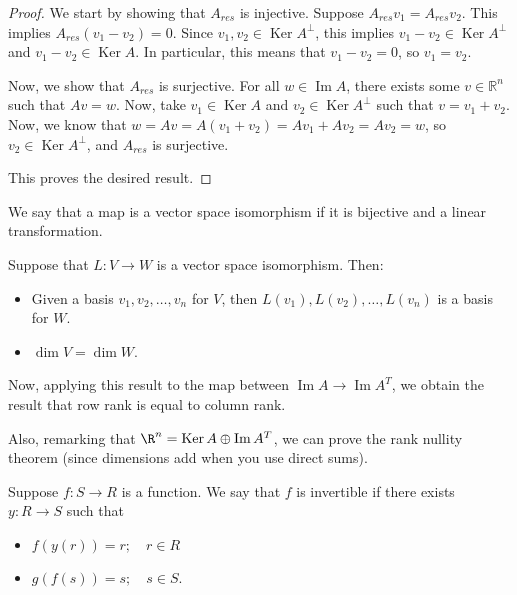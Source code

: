 \documentclass{article}
\newcommand{\RR}{\mathbb{R}}
\DeclareMathOperator{\Ker}{Ker}
\DeclareMathOperator{\Ima}{Im}
\DeclareMathOperator{\Ima}{Im}
\begin{document}
\begin{proof}
  We start by showing that $A_{res}$ is injective.  Suppose $A_{res} v_1 = A_{res} v_2$.  This implies $A_{res} (v_1 - v_2) = 0$.  Since $v_1, v_2 \in \Ker A^{\perp}$, this implies $v_1 - v_2 \in \Ker A^{\perp}$ and $v_1 - v_2 \in \Ker A$.  In particular, this means that $v_1 - v_2 = 0$, so $v_1 = v_2$.

  Now, we show that $A_{res}$ is surjective.  For all $w \in \Ima A$, there exists some $v \in \RR^n$ such that $Av = w$.  Now, take $v_1 \in \Ker A$ and $v_2 \in \Ker A^{\perp}$ such that $v = v_1 + v_2$.  Now, we know that $w = Av = A(v_1 + v_2) = Av_1 + Av_2 = Av_2 = w$, so $v_2 \in \Ker A^{\perp}$, and $A_{res}$ is surjective.

  This proves the desired result.
\end{proof}

\begin{definition}
  We say that a map is a vector space isomorphism if it is bijective and a linear transformation.
\end{definition}

\begin{theorem}
  Suppose that $L: V \to W$ is a vector space isomorphism.  Then:
  \begin{itemize}
    \item Given a basis $v_1, v_2, \dots, v_n$ for $V$, then $L(v_1), L(v_2), \dots, L(v_n)$ is a basis for $W$.
    \item $\dim V = \dim W$.
  \end{itemize}
\end{theorem}

Now, applying this result to the map between $\Ima A \to \Ima A^T$, we obtain the result that row rank is equal to column rank.

Also, remarking that $\R^n = \Ker A \oplus \Ima A^T$, we can prove the rank nullity theorem (since dimensions add when you use direct sums).

\begin{definition}
Suppose $f: S \to R$ is a function.  We say that $f$ is invertible if there exists $y: R \to S$ such that

\begin{itemize}
  \item $f(y(r)) = r; \quad r \in R$
  \item $g(f(s)) = s; \quad s \in S$.
\end{itemize}
\end{definition}
\end{document}
